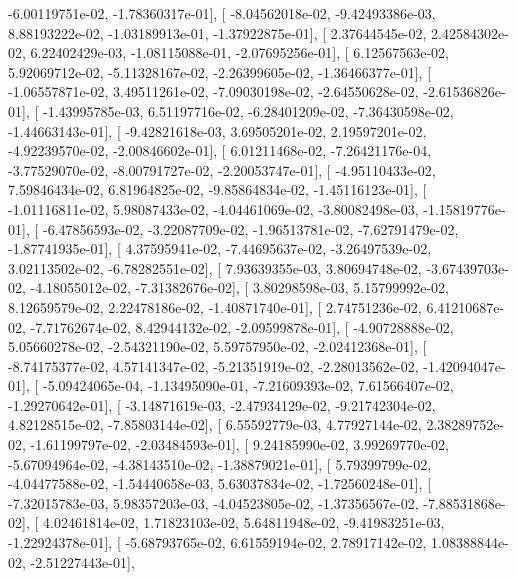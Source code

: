 \documentclass{article}
\begin{document}
         -6.00119751e-02,  -1.78360317e-01],
       [ -8.04562018e-02,  -9.42493386e-03,   8.88193222e-02,
         -1.03189913e-01,  -1.37922875e-01],
       [  2.37644545e-02,   2.42584302e-02,   6.22402429e-03,
         -1.08115088e-01,  -2.07695256e-01],
       [  6.12567563e-02,   5.92069712e-02,  -5.11328167e-02,
         -2.26399605e-02,  -1.36466377e-01],
       [ -1.06557871e-02,   3.49511261e-02,  -7.09030198e-02,
         -2.64550628e-02,  -2.61536826e-01],
       [ -1.43995785e-03,   6.51197716e-02,  -6.28401209e-02,
         -7.36430598e-02,  -1.44663143e-01],
       [ -9.42821618e-03,   3.69505201e-02,   2.19597201e-02,
         -4.92239570e-02,  -2.00846602e-01],
       [  6.01211468e-02,  -7.26421176e-04,  -3.77529070e-02,
         -8.00791727e-02,  -2.20053747e-01],
       [ -4.95110433e-02,   7.59846434e-02,   6.81964825e-02,
         -9.85864834e-02,  -1.45116123e-01],
       [ -1.01116811e-02,   5.98087433e-02,  -4.04461069e-02,
         -3.80082498e-03,  -1.15819776e-01],
       [ -6.47856593e-02,  -3.22087709e-02,  -1.96513781e-02,
         -7.62791479e-02,  -1.87741935e-01],
       [  4.37595941e-02,  -7.44695637e-02,  -3.26497539e-02,
          3.02113502e-02,  -6.78282551e-02],
       [  7.93639355e-03,   3.80694748e-02,  -3.67439703e-02,
         -4.18055012e-02,  -7.31382676e-02],
       [  3.80298598e-03,   5.15799992e-02,   8.12659579e-02,
          2.22478186e-02,  -1.40871740e-01],
       [  2.74751236e-02,   6.41210687e-02,  -7.71762674e-02,
          8.42944132e-02,  -2.09599878e-01],
       [ -4.90728888e-02,   5.05660278e-02,  -2.54321190e-02,
          5.59757950e-02,  -2.02412368e-01],
       [ -8.74175377e-02,   4.57141347e-02,  -5.21351919e-02,
         -2.28013562e-02,  -1.42094047e-01],
       [ -5.09424065e-04,  -1.13495090e-01,  -7.21609393e-02,
          7.61566407e-02,  -1.29270642e-01],
       [ -3.14871619e-03,  -2.47934129e-02,  -9.21742304e-02,
          4.82128515e-02,  -7.85803144e-02],
       [  6.55592779e-03,   4.77927144e-02,   2.38289752e-02,
         -1.61199797e-02,  -2.03484593e-01],
       [  9.24185990e-02,   3.99269770e-02,  -5.67094964e-02,
         -4.38143510e-02,  -1.38879021e-01],
       [  5.79399799e-02,  -4.04477588e-02,  -1.54440658e-03,
          5.63037834e-02,  -1.72560248e-01],
       [ -7.32015783e-03,   5.98357203e-03,  -4.04523805e-02,
         -1.37356567e-02,  -7.88531868e-02],
       [  4.02461814e-02,   1.71823103e-02,   5.64811948e-02,
         -9.41983251e-03,  -1.22924378e-01],
       [ -5.68793765e-02,   6.61559194e-02,   2.78917142e-02,
          1.08388844e-02,  -2.51227443e-01],
\end{document}
